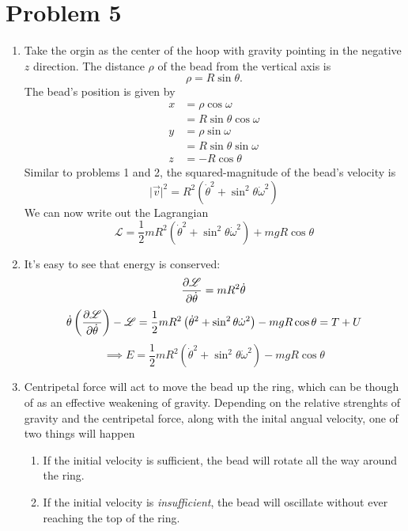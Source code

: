 \documentclass[12pt]{article}
\newcommand{\magsq}[1]{\big|#1\big|^2}
\begin{document}
\section*{Problem 5}
\begin{enumerate}[label=(\alph*)]
    \item Take the orgin as the center of the hoop with gravity pointing in the negative $z$ direction. The distance $\rho$ of the bead from the vertical axis is 
    \[ \rho = R\sin\theta. \]
    The bead's position is given by
    \begin{align*}
        x &= \rho\cos\omega \\
        &= R\sin\theta\cos\omega \\
        y &= \rho\sin\omega \\
        &= R\sin\theta\sin\omega \\
        z &= -R\cos\theta
    \end{align*}
    Similar to problems 1 and 2, the squared-magnitude of the bead's velocity is
    \[ \magsq{\vec{v}} = R^2\left(\dot{\theta}^2 + \sin^2\theta\dot{\omega}^2\right) \]
    We can now write out the Lagrangian
    \[ \boxed{\mathscr{L} = \frac{1}{2}mR^2\left(\dot{\theta}^2 + \sin^2\theta\dot{\omega}^2\right) + mgR\cos\theta} \]

    \item It's easy to see that energy is conserved:
    \[ \pdv{\mathscr{L}}{\dot{\theta}} = mR^2\dot{\theta} \]
    \[ \dot{\theta}\left(\pdv{\mathscr{L}}{\dot{\theta}}\right) - \mathscr{L} = \frac{1}{2}mR^2\left(\dot{\theta}^2 + \sin^2\theta\dot{\omega}^2\right) - mgR\cos\theta = T + U\]
    \[ \implies \boxed{E = \frac{1}{2}mR^2\left(\dot{\theta}^2 + \sin^2\theta\dot{\omega}^2\right) - mgR\cos\theta} \]

    \item Centripetal force will act to move the bead up the ring, which can be though of as an effective weakening of gravity. Depending on the relative strenghts of gravity and the centripetal force, along with the inital angual velocity, one of two things will happen
    \begin{enumerate}[label=(\arabic*)]
        \item If the initial velocity is sufficient, the bead will rotate all the way around the ring.
        \item If the initial velocity is \textit{insufficient}, the bead will oscillate without ever reaching the top of the ring.
    \end{enumerate}    
\end{enumerate}
\end{document}
